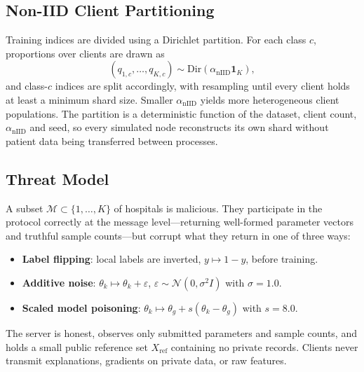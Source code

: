\documentclass[conference]{IEEEtran}
\begin{document}
\subsection{Non-IID Client Partitioning}
Training indices are divided using a Dirichlet partition. For each class $c$,
proportions over clients are drawn as
\begin{equation}
 (q_{1,c},\dots,q_{K,c}) \sim \mathrm{Dir}(\alpha_{\mathrm{nIID}} \mathbf{1}_K),
\end{equation}
and class-$c$ indices are split accordingly, with resampling until every
client holds at least a minimum shard size. Smaller
$\alpha_{\mathrm{nIID}}$ yields more heterogeneous client populations. The
partition is a deterministic function of the dataset, client count,
$\alpha_{\mathrm{nIID}}$ and seed, so every simulated node reconstructs its
own shard without patient data being transferred between processes.

\subsection{Threat Model}
A subset $\mathcal{M} \subset \{1,\dots,K\}$ of hospitals is malicious. They
participate in the protocol correctly at the message level---returning
well-formed parameter vectors and truthful sample counts---but corrupt what
they return in one of three ways:
\begin{itemize}
 \item \textbf{Label flipping}: local labels are inverted, $y \mapsto 1-y$,
 before training.
 \item \textbf{Additive noise}: $\theta_k \mapsto \theta_k + \varepsilon$,
 $\varepsilon \sim \mathcal{N}(0, \sigma^{2} I)$ with $\sigma = 1.0$.
 \item \textbf{Scaled model poisoning}: $\theta_k \mapsto \theta_g +
 s(\theta_k - \theta_g)$ with $s = 8.0$.
\end{itemize}
The server is honest, observes only submitted parameters and sample counts,
and holds a small public reference set $X_{\mathrm{ref}}$ containing no
private records. Clients never transmit explanations, gradients on private
data, or raw features.
\end{document}
